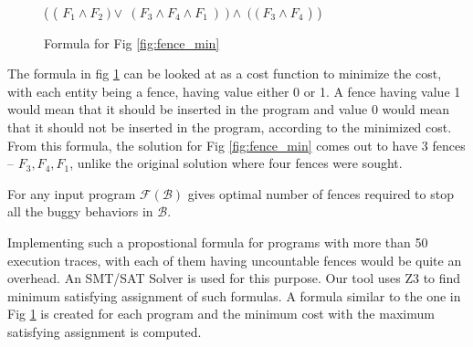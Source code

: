 \begin{figure}
\begin{center}
	( ( $F_1 \land F_2\ ) \lor\ ( F_3 \land F_4 \land F_1\ )\ ) \land\ (\ (\ F_3 \land F_4$ ) )
	\caption{Formula for Fig \ref{fig:fence_min}}
	\label{fig:fence_form}
\end{center}
\end{figure}

\par
The formula in fig \ref{fig:fence_form} can be looked at as a 
cost function to minimize the cost, with each entity being a fence, 
having value either 0 or 1. A fence having value 1 would mean that 
it should be inserted in the program and value 0 would mean that 
it should not be inserted in the program, according to the 
minimized cost. From this formula, the solution for Fig \ref{fig:fence_min} 
comes out to have 3 fences – \textit{$F_3, F_4, F_1$}, 
unlike the original solution where four fences were sought.

\begin{theorem}
	For any input program $ \mathcal{F}(\mathcal{B}) $ gives optimal
	number of fences required to stop all the buggy behaviors in 
	$ \mathcal{B} $.
\end{theorem}

\par
Implementing such a propostional formula for programs with 
more than 50 execution traces, with each of them having uncountable 
fences would be quite an overhead. An SMT/SAT Solver is used for 
this purpose. Our tool uses Z3 to find minimum satisfying assignment 
of such formulas. A formula similar to the one in Fig \ref{fig:fence_form} 
is created for each program and the minimum cost with the maximum 
satisfying assignment is computed. 




